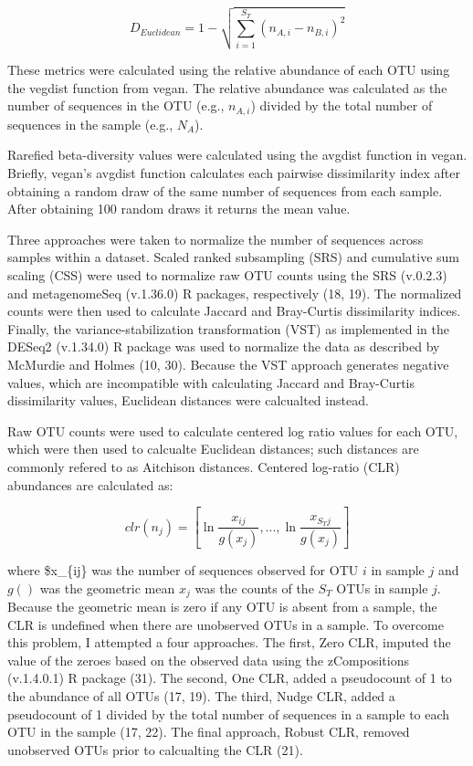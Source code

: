 \documentclass[
]{article}
\begin{document}
\[D_{Euclidean}=1-\sqrt{\sum_{i=1}^{S_T}\left(n_{A,i} - n_{B,i}\right)^2}\]

These metrics were calculated using the relative abundance of each OTU
using the vegdist function from vegan. The relative abundance was
calculated as the number of sequences in the OTU (e.g., \(n_{A,i}\))
divided by the total number of sequences in the sample (e.g., \(N_A\)).

Rarefied beta-diversity values were calculated using the avgdist
function in vegan. Briefly, vegan's avgdist function calculates each
pairwise dissimilarity index after obtaining a random draw of the same
number of sequences from each sample. After obtaining 100 random draws
it returns the mean value.

Three approaches were taken to normalize the number of sequences across
samples within a dataset. Scaled ranked subsampling (SRS) and cumulative
sum scaling (CSS) were used to normalize raw OTU counts using the SRS
(v.0.2.3) and metagenomeSeq (v.1.36.0) R packages, respectively (18,
19). The normalized counts were then used to calculate Jaccard and
Bray-Curtis dissimilarity indices. Finally, the variance-stabilization
transformation (VST) as implemented in the DESeq2 (v.1.34.0) R package
was used to normalize the data as described by McMurdie and Holmes (10,
30). Because the VST approach generates negative values, which are
incompatible with calculating Jaccard and Bray-Curtis dissimilarity
values, Euclidean distances were calcualted instead.

Raw OTU counts were used to calculate centered log ratio values for each
OTU, which were then used to calcualte Euclidean distances; such
distances are commonly refered to as Aitchison distances. Centered
log-ratio (CLR) abundances are calculated as:

\[
clr\left(n_j\right) = \left[ \ln\frac{x_{ij}}{g(x_j)}, ..., \ln\frac{x_{S_Tj}}{g(x_j)}\right]
\]

where \$x\_\{ij\} was the number of sequences observed for OTU \(i\) in
sample \(j\) and \(g()\) was the geometric mean \(x_j\) was the counts
of the \(S_T\) OTUs in sample \(j\). Because the geometric mean is zero
if any OTU is absent from a sample, the CLR is undefined when there are
unobserved OTUs in a sample. To overcome this problem, I attempted a
four approaches. The first, Zero CLR, imputed the value of the zeroes
based on the observed data using the zCompositions (v.1.4.0.1) R package
(31). The second, One CLR, added a pseudocount of 1 to the abundance of
all OTUs (17, 19). The third, Nudge CLR, added a pseudocount of 1
divided by the total number of sequences in a sample to each OTU in the
sample (17, 22). The final approach, Robust CLR, removed unobserved OTUs
prior to calcualting the CLR (21).
\end{document}

